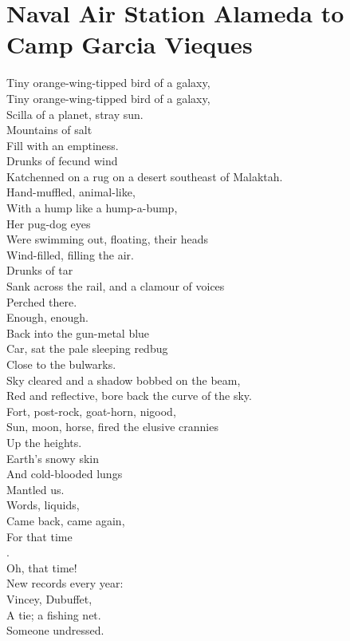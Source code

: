 \documentclass[smalldemyvopaper,11pt,twoside,onecolumn,openright,extrafontsizes]{memoir}
\begin{document}
\chapter{Naval Air Station Alameda to Camp Garcia Vieques}
Tiny orange-wing-tipped bird of a galaxy,
\\Tiny orange-wing-tipped bird of a galaxy,
\\Scilla of a planet, stray sun.
\\Mountains of salt
\\Fill with an emptiness.
\\Drunks of fecund wind
\\Katchenned on a rug on a desert southeast of Malaktah.
\\Hand-muffled, animal-like,
\\With a hump like a hump-a-bump,
\\Her pug-dog eyes
\\Were swimming out, floating, their heads
\\Wind-filled, filling the air.
\\Drunks of tar
\\Sank across the rail, and a clamour of voices
\\Perched there.
\\Enough, enough.
\\Back into the gun-metal blue
\\Car, sat the pale sleeping redbug
\\Close to the bulwarks.
\\Sky cleared and a shadow bobbed on the beam,
\\Red and reflective, bore back the curve of the sky.
\\Fort, post-rock, goat-horn, nigood,
\\Sun, moon, horse, fired the elusive crannies
\\Up the heights.
\\Earth's snowy skin
\\And cold-blooded lungs
\\Mantled us.
\\Words, liquids,
\\Came back, came again,
\\For that time
\\.
\\Oh, that time!
\\New records every year:
\\Vincey, Dubuffet,
\\A tie; a fishing net.
\\Someone undressed.
\end{document}
